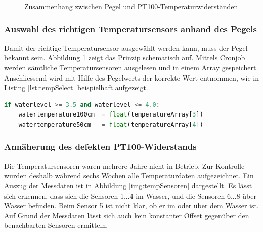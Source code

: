 \begin{figure}[htbp]
	\centering
	\caption{Zusammenhang zwischen Pegel und PT100-Temperaturwiderständen}
	\label{img:wassertempsensoren}
\end{figure}

\subsubsection{Auswahl des richtigen Temperatursensors anhand des Pegels}
Damit der richtige Temperatursensor ausgewählt werden kann, muss der Pegel bekannt sein. Abbildung \ref{img:wassertempsensoren} zeigt das Prinzip schematisch auf. Mittels Cronjob werden sämtliche Temperatursensoren ausgelesen und in einem Array gespeichert. Anschliessend wird mit Hilfe des Pegelwerts der korrekte Wert entnommen, wie in Listing \ref{lst:tempSelect} beispielhaft aufgezeigt.

\begin{lstlisting}[label=lst:tempSelect,caption=Auswahl des richtigen Temperatursensors, language=Python, style=py]
if waterlevel >= 3.5 and waterlevel <= 4.0:
    watertemperature100cm  = float(temperatureArray[3])
    watertemperature50cm   = float(temperatureArray[4])
\end{lstlisting}




\subsubsection{Annäherung des defekten PT100-Widerstands}
Die Temperatursensoren waren mehrere Jahre nicht in Betrieb. Zur Kontrolle wurden deshalb während sechs Wochen alle Temperaturdaten aufgezeichnet. Ein Auszug der Messdaten ist in Abbildung \ref{img:tempSensoren} dargestellt. Es lässt sich erkennen, dass sich die Sensoren 1...4 im Wasser, und die Sensoren 6...8 über Wasser befinden. Beim Sensor 5 ist nicht klar, ob er im oder über dem Wasser ist. Auf Grund der Messdaten lässt sich auch kein konstanter Offset gegenüber den benachbarten Sensoren ermitteln.

